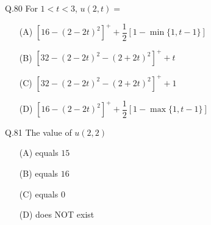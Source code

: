 \documentclass{article}
\begin{document}
																																																																																																																								      Q.80 \quad For $1 < t < 3$, $u(2,t) =$  
																																																																																																																								      \begin{itemize}
																																																																																																																								          \item[(A)] $\left[16 - (2 - 2t)^2\right]^+ + \dfrac{1}{2}\left[1 - \min\{1, t - 1\}\right]$
																																																																																																																									      \item[(B)] $\left[32 - (2 - 2t)^2 - (2 + 2t)^2\right]^+ + t$
																																																																																																																									          \item[(C)] $\left[32 - (2 - 2t)^2 - (2 + 2t)^2\right]^+ + 1$
																																																																																																																										      \item[(D)] $\left[16 - (2 - 2t)^2\right]^+ + \dfrac{1}{2}\left[1 - \max\{1, t - 1\}\right]$
																																																																																																																										      \end{itemize}

																																																																																																																										      \bigskip

																																																																																																																										      Q.81 \quad The value of $u(2,2)$  
																																																																																																																										      \begin{itemize}
																																																																																																																										          \item[(A)] equals $15$
																																																																																																																											      \item[(B)] equals $16$
																																																																																																																											          \item[(C)] equals $0$
																																																																																																																												      \item[(D)] does NOT exist
																																																																																																																												      \end{itemize}
\end{document}
